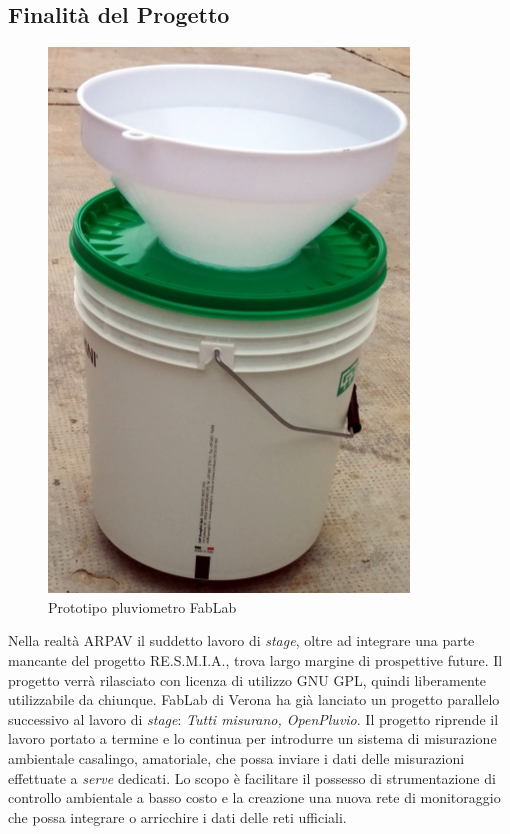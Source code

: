 \subsection{Finalità del Progetto}
\begin{figure}[htbp]
\centering
\includegraphics[scale=.3]{./capitoli/capitolo2/img/pluviometro}
\caption{Prototipo pluviometro FabLab}
\end{figure}

Nella realtà ARPAV il suddetto lavoro di \textit{stage}, oltre ad integrare una parte mancante del progetto RE.S.M.I.A., trova largo margine di prospettive future. Il progetto verrà rilasciato con licenza di utilizzo GNU GPL, quindi liberamente utilizzabile da chiunque. FabLab di Verona ha già lanciato un progetto parallelo successivo al lavoro di \textit{stage}: \textit{Tutti misurano, OpenPluvio}. Il progetto riprende il lavoro portato a termine e lo continua per introdurre un sistema di misurazione ambientale casalingo, amatoriale, che possa inviare i dati delle misurazioni effettuate a \textit{serve} dedicati. Lo scopo è facilitare il possesso di strumentazione di controllo ambientale a basso costo e la creazione una nuova rete di monitoraggio che possa integrare o arricchire i dati delle reti ufficiali.




